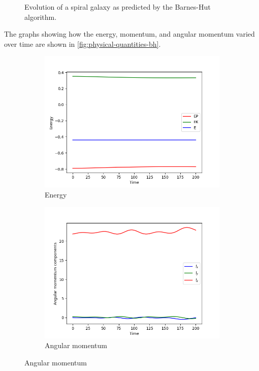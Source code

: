 \begin{figure}[htp]
    \caption{Evolution of a spiral galaxy as predicted by the Barnes-Hut algorithm.}
    \label{fig:spiral-galaxy-evolution-bh}
\end{figure}
The graphs showing how the energy, momentum, and angular momentum varied over time are shown in \autoref{fig:physical-quantities-bh}.
\begin{figure}[htp]
    \centering
    \begin{subfigure}[b]{0.45\textwidth}
        \centering
        \includegraphics[width=\textwidth]{img/bh/energy.png}
        \caption{Energy}
        \label{fig:physical-quantities-bh-sub1}
    \end{subfigure}
    \hfill
    \begin{subfigure}[b]{0.45\textwidth}
        \centering
        \includegraphics[width=\textwidth]{img/bh/angular-momentum.png}
        \caption{Angular momentum}
        \label{fig:physical-quantities-bh-sub2}
    \end{subfigure}


\end{figure}
